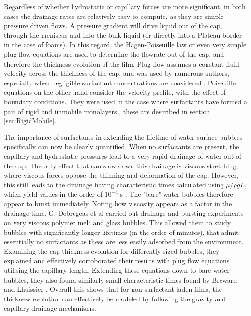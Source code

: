 \documentclass[a4paper,12pt]{article}
\numberwithin{equation}{section}
\numberwithin{figure}{section}
\numberwithin{table}{section}
\begin{document}
Regardless of whether hydrostatic or capillary forces are more significant, in both cases the drainage rates are relatively easy to compute, as they are simple pressure driven flows. A pressure gradient will drive liquid out of the cap, through the meniscus and into the bulk liquid (or directly into a Plateau border in the case of foams). In this regard, the Hagen-Poiseuille law or even very simple plug flow equations are used to determine the flowrate out of the cap, and therefore the thickness evolution of the film. Plug flow assumes a constant fluid velocity across the thickness of the cap, and was used by numerous authors, especially when negligible surfactant concentrations are considered \cite{Debregeas1998, Lhuissier2011, Breward2002, ChampougnyNotBare2016}. Poiseuille equations on the other hand consider the velocity profile, with the effect of boundary conditions. They were used in the case where surfactants have formed a pair of rigid and immobile monolayers \cite{Nierstrasz1999, Bruinsma1995, Modini2013}, these are described in section \ref{sec:RigidMobile}.

The importance of surfactants in extending the lifetime of water surface bubbles specifically can now be clearly quantified. When no surfactants are present, the capillary and hydrostatic pressures lead to a very rapid drainage of water out of the cap. The only effect that can slow down this drainage is viscous stretching, where viscous forces oppose the thinning and deformation of the cap. However, this still leads to the drainage having characteristic times calculated using $\mu / \rho g L$, which yield values in the order of $10^{-4}$ s \cite{Breward2002, Lhuissier2011}. The "bare" water bubbles therefore appear to burst immediately. Noting how viscosity appears as a factor in the drainage time, G. Debregeas et al \cite{Debregeas1998} carried out drainage and bursting experiments on very viscous polymer melt and glass bubbles. This allowed them to study bubbles with significantly longer lifetimes (in the order of minutes), that admit essentially no surfactants as these are less easily adsorbed from the environment. Examining the cap thickness evolution for differently sized bubbles, they explained and effectively corroborated their results with plug flow equations utilising the capillary length. Extending these equations down to bare water bubbles, they also found similarly small characteristic times found by Breward and Lhuissier \cite{Breward2002, Lhuissier2011}. Overall this shows that for non-surfactant laden films, the thickness evolution can effectively be modeled by following the gravity and capillary drainage mechanisms.
\end{document}
